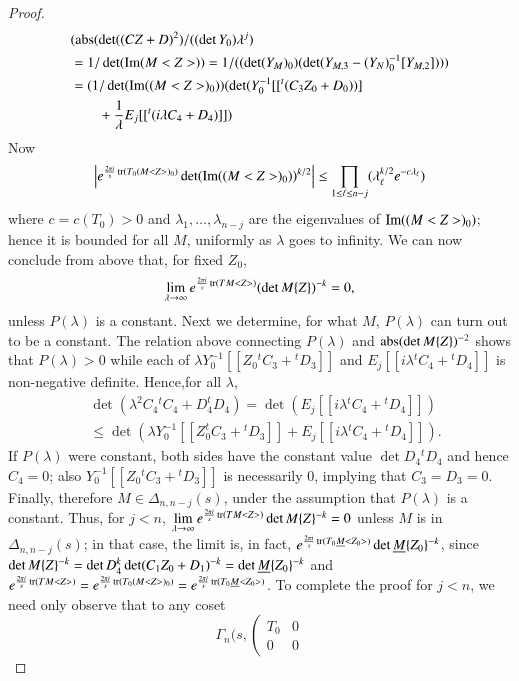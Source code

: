 \begin{proof}
\begin{align*}
& (\operatorname{abs}(\det((CZ+D)^{2})/((\det Y_{0})\lambda^{j})\\
& =1/\det(\operatorname{Im}(M<Z>))=1/((\det(Y_{M})_{0})(\det
(Y_{M,3}-(Y_{N})^{-1}_{0}[Y_{M,2}])))\\
&=(1/\det(\operatorname{Im}((M<Z>)_{0}))(\det
(Y^{-1}_{0}[[{}^{t}(C_{3}Z_{0}+D_{0}))]\\
&\qquad +\frac{1}{\lambda}E_{j}[[{}^{t}(i\lambda
      C_{4}+D_{4})]]) 
\end{align*}
Now
$$
\left|
e^{\frac{2\pi
    i}{s}\tr(T_{0}(M<Z>)_{0})}\det(\Iim((M<Z>)_{0}))^{k/2}\right|\leq
\prod_{1\leq \ell\leq n-j}(\lambda^{k/2}_{\ell} e^{-c\lambda_\ell}) 
$$
where $c=c(T_{0})>0$ and $\lambda_{1},\ldots,\lambda_{n-j}$ are the
eigenvalues of $\Iim((M<Z>)_{0})$; hence it is bounded for all $M$,
uniformly as $\lambda$ goes to infinity. We can now conclude from
above that, for fixed $Z_{0}$,
$$
\lim\limits_{\lambda\to \infty}e^{\frac{2\pi i}{s}\tr(TM<Z>)}(\det M\{Z\})^{-k}=0,
$$
unless $P(\lambda)$ is a constant. Next we determine, for what $M$,
$P(\lambda)$ can turn out to be a constant. The relation above
connecting $P(\lambda)$ and $\abs\break(\det M\{Z\})^{-2}$ shows that
$P(\lambda)>0$ while each of $\lambda
Y^{-1}_{0}[[Z_{0}{}^{t}C_{3}+{}^{t}D_{3}]]$ and
$E_{j}[[i\lambda{}^{t}C_{4}+{}^{t}D_{4}]]$ is non-negative definite.
Hence,\pageoriginale for all $\lambda$,
\begin{align*}
& \det (\lambda^{2}C_{4}{}^{t}C_{4}+D^{t}_{4}D_{4})=\det
(E_{j}[[i\lambda{}^{t}C_{4}+{}^{t}D_{4}]])\\
& \leq \det (\lambda Y^{-1}_{0}[[Z^{t}_{0}C_{3}+{}^{t}D_{3}]]+E_{j}[[i\lambda{}^{t}C_{4}+{}^{t}D_{4}]]).
\end{align*}
If $P(\lambda)$ were constant, both sides have the constant value
$\det D_{4}{}^{t}D_{4}$ and hence $C_{4}=0$; also
$Y^{-1}_{0}[[Z_{0}{}^{t}C_{3}+{}^{t}D_{3}]]$ is necessarily $0$,
implying that $C_{3}=D_{3}=0$. Finally, therefore
$M\in\Delta_{n,n-j}(s)$, under the assumption that $P(\lambda)$ is a
constant. Thus, for $j<n$, $\lim\limits_{\lambda\to
  \infty}e^{\frac{2\pi i}{s}\tr(TM<Z>)}\det M\{Z\}^{-k}=0$ unless $M$
is in $\Delta_{n,n-j}(s)$; in that case, the limit is, in fact,
$e^{\frac{2\pi i}{s}\tr(T_{0}\ub{M}<Z_{0}>)}\break\det
\ub{M}\{Z_{0}\}^{-k}$, since $\det M\{Z\}^{-k}=\det D^{k}_{4}\det
(C_{1}Z_{0}+D_{1})^{-k}=\det \ub{M}\{Z_{0}\}^{-k}$ and $e^{\frac{2\pi
    i}{s}\tr(TM<Z>)}=e^{\frac{2\pi
    i}{s}\tr(T_{0}(M<Z>)_{0})}=e^{\frac{2\pi
    i}{s}\tr(T_{0}\ub{M}<Z_{0}>)}$. To complete the proof for $j<n$,
we need only observe that to any coset
$$\Gamma_{n}(s,\left(\begin{smallmatrix} T_{0} & 0\\ 0 & 0

\end{smallmatrix}$$
\end{proof}
